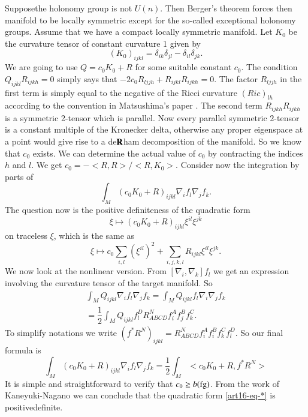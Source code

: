 Suppose\pageoriginale the holonomy group is not $U(n)$. Then Berger's theorem forces then manifold to be locally symmetric except for the so-called exceptional holonomy groups. Assume that we have a compact locally symmetric manifold. Let $K_{0}$ be the curvature tensor of constant curvature 1 given by
$$
(K_{0})_{ijkl}=\delta_{ik}\delta_{jl}-\delta_{il}\delta_{jk}.
$$
We are going to use $Q=c_{0}K_{0} + R$ for some suitable constant $c_{0}$. The condition $Q_{ijkl}R_{ijkh}=0$ simply says that $-2 c_{0}R_{ljjh} + R_{ijkl}R_{ijkh}=0$. The factor $R_{ljjh}$ in the first term is simply equal to the negative of the Ricci curvature $(Ric)_{lh}$ according to the convention in Matsushima's paper \cite{art16-keyMat}. The second term $R_{ijkh}R_{ijkh}$ is a symmetric 2-tensor which is parallel. Now every parallel symmetric 2-tensor is a constant multiple of the Kronecker delta, otherwise any proper eigenspace at a point would give rise to a de$\mathbf{R}$ham decomposition of the manifold. So we know that $c_{0}$ exists. We can determine the actual value of $c_{0}$ by contracting the indices $h$ and $l$. We get $c_{0}= -< R, R > /< R, K_{0} >$. Consider now the integration by parts of
$$
\int_{M}(c_{0}K_{0}+ R)_{ijkl}\nabla_{i}f_{l}\nabla_{j}f_{k}.
$$
The question now is the positive definiteness of the quadratic form
$$
\xi \mapsto (c_{0}K_{0} + R)_{ijkl}\xi^{il}\xi^{jk}
$$
on traceless $\xi$, which is the same as
\begin{equation}
\xi \mapsto c_{0} \sum\limits_{i,l}(\xi^{il})^{2} + \sum\limits_{i,j,k,l} R_{ijkl}\xi^{il}\xi^{jk}. \tag{$\ast$}\label{art16-eq-*}
\end{equation}
We now look at the nonlinear version. From $\left[\nabla_{i}, \nabla_{k} \right]f_{l}$ we get an expression involving the curvature tensor of the target manifold. So
\begin{gather*}
\int_{M}Q_{ijkl}\nabla_{i}f_{l} \nabla_{j}f_{k}= \int_{M}Q_{ijkl}f_{l}\nabla_{i}\nabla_{j}f_{k}\\
= \dfrac{1}{2}\int_{M}Q_{ijkl}f_{l}^{D} R_{ABCD}^{N}f_{i}^{A}f_{j}^{B}f_{k}^{C}.
\end{gather*}
To simplify notations we write $(f^{*}R^{N})_{ijkl} =R_{ABCD}^{N}f_{i}^{A}f_{i}^{B}f_{k}^{C}f_{l}^{D}$. So our final formula is
$$
\int_{M}(c_{0}K_{0} + R)_{ijkl} \nabla_{i}f_{l}\nabla_{j}f_{k} = \dfrac{1}{2}\int_{M} < c_{0}K_{0} + R, f^{*}R^{N} >
$$
It is simple and straightforward to verify that $c_{0} \geq b(\operatorname{fg})$. From the work of Kaneyuki-Nagano \cite{art16-keyK-N} we can conclude that the quadratic form \eqref{art16-eq-*} is positive\pageoriginale definite.

